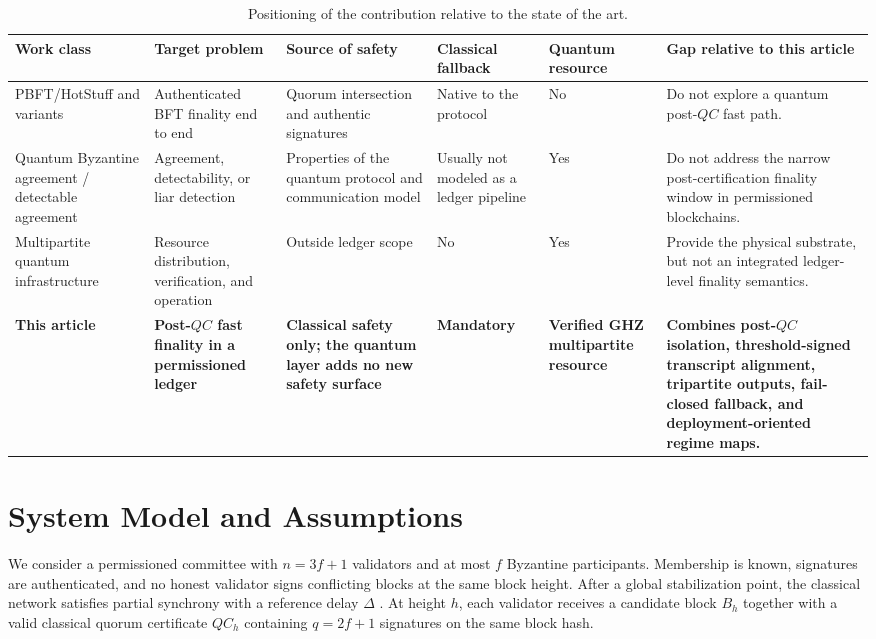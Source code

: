 \documentclass{ieeeaccess}
\begin{document}
\begin{table}[!t]
\caption{Positioning of the contribution relative to the state of the art.}
\label{tab:novelty}
\centering
\footnotesize
\renewcommand{\arraystretch}{1.16}
\begin{tabularx}{\textwidth}{p{2.5cm}p{2.5cm}p{2.4cm}p{1.6cm}p{1.5cm}Y}
\toprule
\textbf{Work class} & \textbf{Target problem} & \textbf{Source of safety} & \textbf{Classical fallback} & \textbf{Quantum resource} & \textbf{Gap relative to this article} \\
\midrule
PBFT/HotStuff and variants \cite{b2,b4,b5} & Authenticated BFT finality end to end & Quorum intersection and authentic signatures & Native to the protocol & No & Do not explore a quantum post-$QC$ fast path. \\
Quantum Byzantine agreement / detectable agreement \cite{b7,b8,b9,b10,b11,b12,b17,b18} & Agreement, detectability, or liar detection & Properties of the quantum protocol and communication model & Usually not modeled as a ledger pipeline & Yes & Do not address the narrow post-certification finality window in permissioned blockchains. \\
Multipartite quantum infrastructure \cite{b19,b20,b21,b22,b23} & Resource distribution, verification, and operation & Outside ledger scope & No & Yes & Provide the physical substrate, but not an integrated ledger-level finality semantics. \\
\textbf{This article} & \textbf{Post-$QC$ fast finality in a permissioned ledger} & \textbf{Classical safety only; the quantum layer adds no new safety surface} & \textbf{Mandatory} & \textbf{Verified GHZ multipartite resource} & \textbf{Combines post-$QC$ isolation, threshold-signed transcript alignment, tripartite outputs, fail-closed fallback, and deployment-oriented regime maps.} \\
\bottomrule
\end{tabularx}
\end{table}

\section{System Model and Assumptions}
\label{sec:model}
We consider a permissioned committee with $n = 3f + 1$ validators and at most $f$ Byzantine participants. Membership is known, signatures are authenticated, and no honest validator signs conflicting blocks at the same block height. After a global stabilization point, the classical network satisfies partial synchrony with a reference delay $\Delta$ \cite{b24,b25}. At height $h$, each validator receives a candidate block $B_h$ together with a valid classical quorum certificate $QC_h$ containing $q = 2f + 1$ signatures on the same block hash.
\end{document}
